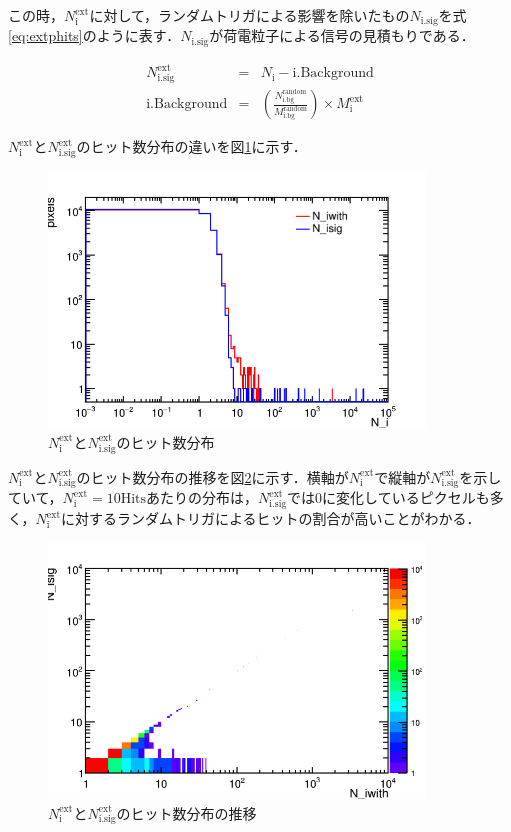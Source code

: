 この時，$N_{\mathrm{i}}^{\mathrm{ext}}$に対して，ランダムトリガによる影響を除いたもの$N_{\mathrm{i.sig}}$を式\ref{eq:extphits}のように表す．$N_{\mathrm{i.sig}}$が荷電粒子による信号の見積もりである．
  
\begin{eqnarray}
  \label{eq:extphits}
  N_{\mathrm{i.sig}}^{\mathrm{ext}} &=& N_{\mathrm{i}} - \mathrm{i.Background} \\
  \mathrm{i.Background} &=& \left(\frac{N_{\mathrm{i.bg}}^{\mathrm{random}}}{M_{\mathrm{i.bg}}^{\mathrm{random}}} \right) \times M_{\mathrm{i}}^{\mathrm{ext}}
\end{eqnarray}

$N_{\mathrm{i}}^{\mathrm{ext}}$と$N_{\mathrm{i.sig}}^{\mathrm{ext}}$のヒット数分布の違いを図\ref{fig:exthitperpix}に示す．
\begin{figure}[h]
  \centering
  \includegraphics[width=10cm]{./figure/exthitperpix.png}
  \caption{$N_{\mathrm{i}}^{\mathrm{ext}}$と$N_{\mathrm{i.sig}}^{\mathrm{ext}}$のヒット数分布}
  \label{fig:exthitperpix}
\end{figure}

$N_{\mathrm{i}}^{\mathrm{ext}}$と$N_{\mathrm{i.sig}}^{\mathrm{ext}}$のヒット数分布の推移を図\ref{fig:exthitperpixbfaf}に示す．横軸が$N_{\mathrm{i}}^{\mathrm{ext}}$で縦軸が$N_{\mathrm{i.sig}}^{\mathrm{ext}}$を示していて，$N_{\mathrm{i}}^{\mathrm{ext}}=10 \mathrm{Hits}$あたりの分布は，$N_{\mathrm{i.sig}}^{\mathrm{ext}}$では0に変化しているピクセルも多く，$N_{\mathrm{i}}^{\mathrm{ext}}$に対するランダムトリガによるヒットの割合が高いことがわかる．
\begin{figure}[h]
  \centering
  \includegraphics[width=10cm]{./figure/exthitperpixbfaf.png}
  \caption{$N_{\mathrm{i}}^{\mathrm{ext}}$と$N_{\mathrm{i.sig}}^{\mathrm{ext}}$のヒット数分布の推移}
  \label{fig:exthitperpixbfaf}
\end{figure}

